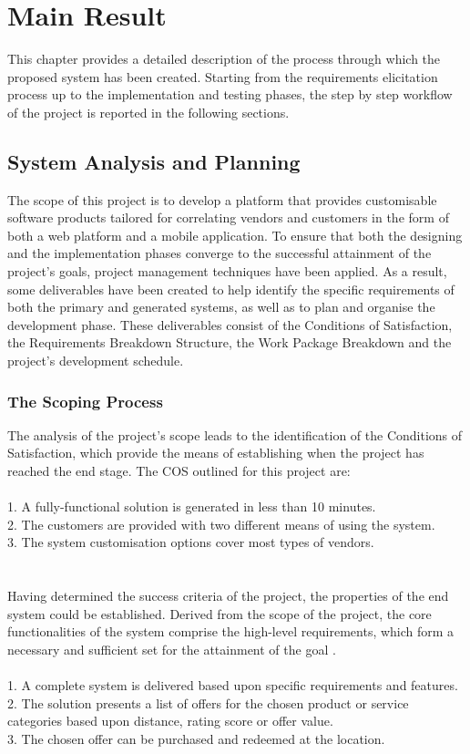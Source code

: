 \section{Main Result}
This chapter provides a detailed description of the process through which the proposed system has been created. Starting from the requirements elicitation process up to the implementation and testing phases, the step by step workflow of the project is reported in the following sections.

\subsection{System Analysis and Planning}
The scope of this project is to develop a platform that provides customisable software products tailored for correlating vendors and customers in the form of both a web platform and a mobile application. To ensure that both the designing and the implementation phases converge to the successful attainment of the project's goals, project management techniques have been applied. As a result, some deliverables have been created to help identify the specific requirements of both the primary and generated systems, as well as to plan and organise the development phase. These deliverables consist of the Conditions of Satisfaction, the Requirements Breakdown Structure, the Work Package Breakdown and the project's development schedule.

\subsubsection{The Scoping Process}
The analysis of the project's scope leads to the identification of the Conditions of Satisfaction, which provide the means of establishing when the project has reached the end stage. The COS outlined for this project are:\\\\
1. A fully-functional solution is generated in less than 10 minutes.\\
2. The customers are provided with two different means of using the system.\\
3. The system customisation options cover most types of vendors.\\\\\\

Having determined the success criteria of the project, the properties of the end system could be established. Derived from the scope of the project, the core functionalities of the system comprise the high-level requirements, which form a necessary and sufficient set for the attainment of the goal \cite{holyer_2016}.\\\\
1. A complete system is delivered based upon specific requirements and features.\\
2. The solution presents a list of offers for the chosen product or service categories based upon distance, rating score or offer value.\\
3. The chosen offer can be purchased and redeemed at the location.\\

